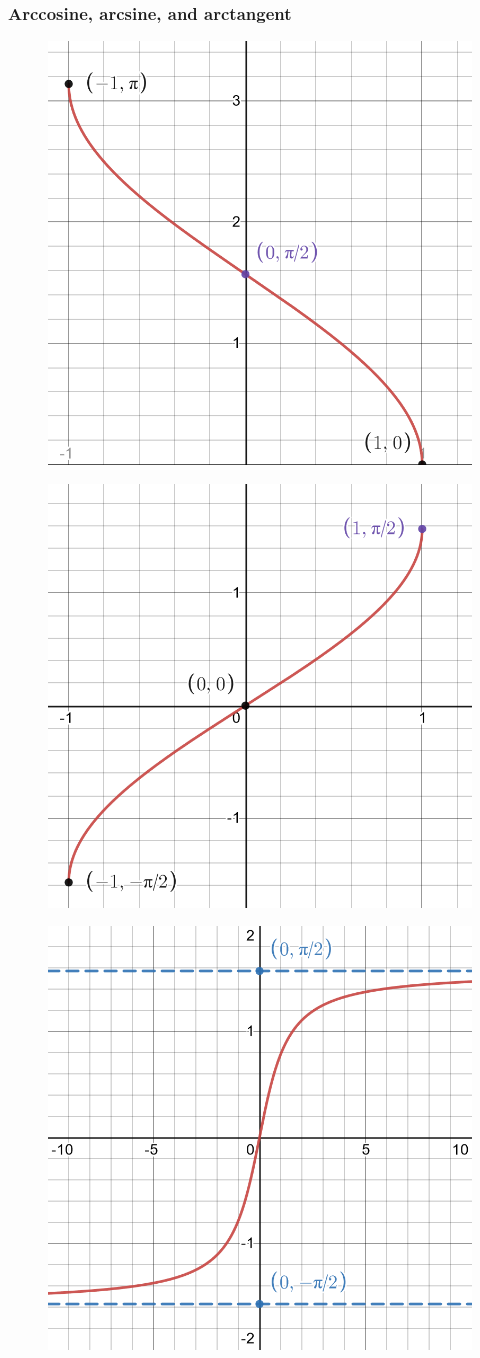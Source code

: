 \documentclass[letterpaper,9pt,fleqn]{extarticle}
\begin{document}
\subsubsection*{Arccosine, arcsine, and arctangent}
\vspace{-0.2in}
\begin{figure}[h]
\centering
\begin{minipage}{.333\textwidth}
  \centering
  \includegraphics[width=.25\linewidth]{desmos-graph-invcos}
  \label{fig:test1}
\end{minipage}%
\begin{minipage}{.333\textwidth}
  \centering
  \includegraphics[width=.25\linewidth]{desmos-graph-invsin}
  \label{fig:test2}
\end{minipage}%
\begin{minipage}{.333\textwidth}
  \centering
  \includegraphics[width=.25\linewidth]{desmos-graph-invtan}
  \label{fig:test2}
\end{minipage}
\end{figure}
\end{document}
